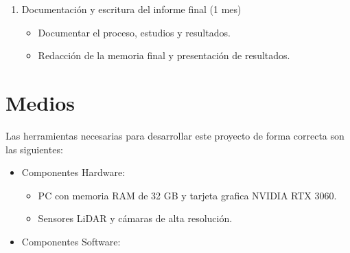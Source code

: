 \begin{enumerate}
\item Documentación y escritura del informe final (1 mes)
	\begin{itemize}
		\item Documentar el proceso, estudios y resultados.
		\item Redacción de la memoria final y presentación de resultados.
	\end{itemize}

\end{enumerate}


\section{Medios}
\label{sec:medios}

Las herramientas necesarias para desarrollar este proyecto de forma correcta
son las siguientes:
\begin{itemize}

\item Componentes Hardware:
	\begin{itemize}
	\item PC con memoria RAM de 32 GB y tarjeta grafica NVIDIA RTX 3060.
	\item Sensores LiDAR y cámaras de alta resolución.
	\end{itemize}

\item Componentes Software:

\end{itemize}


% 


